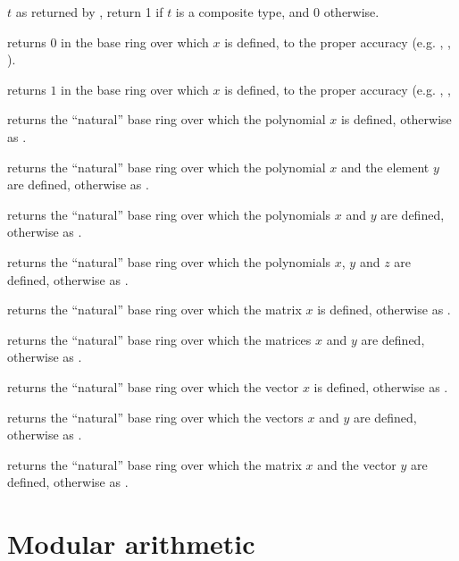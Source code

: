  $t$ as returned by ,
return 1 if $t$ is a composite type, and 0 otherwise.

 returns $0$ in the base ring over which $x$
is defined, to the proper accuracy (e.g. , ,
).

 returns $1$ in the base ring over which $x$
is defined, to the proper accuracy (e.g. , ,

 returns
the ``natural'' base ring over which the polynomial $x$ is defined,
otherwise as .

returns the ``natural'' base ring over which the polynomial $x$ and the element
$y$ are defined, otherwise as .

 returns
the ``natural'' base ring over which the polynomials $x$ and $y$ are defined,
otherwise as .

returns the ``natural'' base ring over which the polynomials $x$, $y$ and $z$
are defined, otherwise as .

 returns
the ``natural'' base ring over which the matrix $x$ is defined,
otherwise as .

 returns
the ``natural'' base ring over which the matrices $x$ and $y$ are defined,
otherwise as .

 returns
the ``natural'' base ring over which the vector $x$ is defined,
otherwise as .

 returns
the ``natural'' base ring over which the vectors $x$ and $y$ are defined,
otherwise as .

returns the ``natural'' base ring over which the matrix $x$ and the vector
$y$ are defined, otherwise as .

\section{Modular arithmetic}

